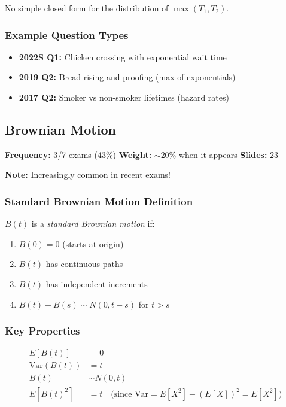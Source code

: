 \documentclass[11pt,letterpaper]{article}
\begin{document}
No simple closed form for the distribution of $\max(T_1, T_2)$.

\subsubsection{Example Question Types}

\begin{itemize}[leftmargin=*]
  \item \textbf{2022S Q1:} Chicken crossing with exponential wait time
  \item \textbf{2019 Q2:} Bread rising and proofing (max of exponentials)
  \item \textbf{2017 Q2:} Smoker vs non-smoker lifetimes (hazard rates)
\end{itemize}

\subsection{Brownian Motion}

\textbf{Frequency:} 3/7 exams (43\%) \quad \textbf{Weight:} $\sim$20\% when it appears \quad \textbf{Slides:} 23

\textbf{Note:} Increasingly common in recent exams!

\subsubsection{Standard Brownian Motion Definition}

$B(t)$ is a \textit{standard Brownian motion} if:
\begin{enumerate}
  \item $B(0) = 0$ (starts at origin)
  \item $B(t)$ has continuous paths
  \item $B(t)$ has independent increments
  \item $B(t) - B(s) \sim N(0, t-s)$ for $t > s$
\end{enumerate}

\subsubsection{Key Properties}

\begin{align*}
E[B(t)] &= 0 \\
\text{Var}(B(t)) &= t \\
B(t) &\sim N(0, t) \\
E[B(t)^2] &= t \quad \text{(since } \text{Var} = E[X^2] - (E[X])^2 = E[X^2]\text{)}
\end{align*}
\end{document}
